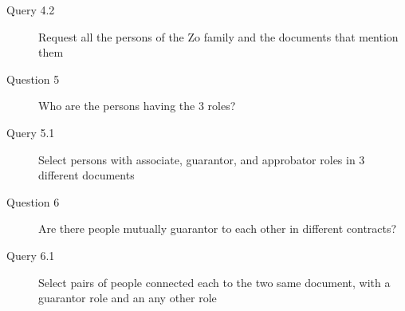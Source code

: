 \begin{enumerate}
\begin{small}
\begin{description}
            \item[\myindent Query 4.2] Request all the persons of the Zo family and  the documents that mention them
            \item[Question 5] Who are the persons having the 3 roles?
            \item[\myindent Query 5.1] Select persons with associate, guarantor, and approbator roles in 3 different documents
            \item[Question 6] Are there people mutually guarantor to each other in different contracts?
            \item[\myindent Query 6.1] Select pairs of people connected each to the two same document, with a guarantor role and an any other role
        \end{description}
    \end{small}


\end{enumerate}
